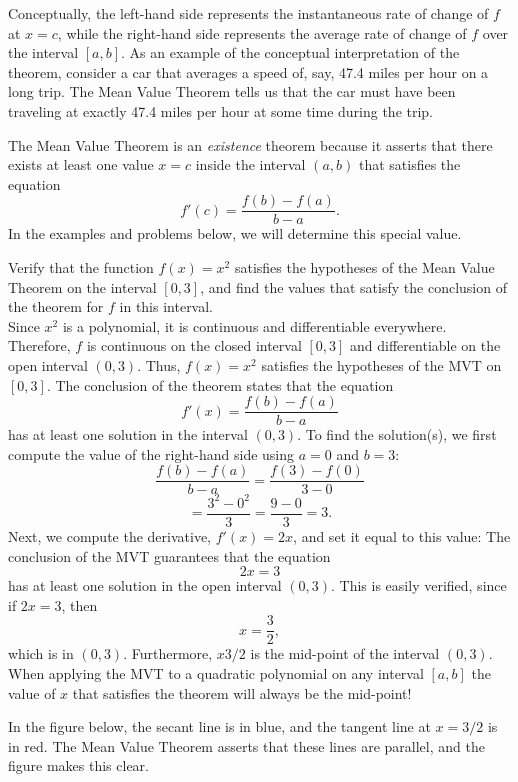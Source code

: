 \documentclass[handout]{ximera}
\begin{document}
Conceptually, the left-hand side represents the instantaneous rate of change of $f$ at $x = c$, while the
right-hand side represents the average rate of change of $f$ over the interval $[a,b]$. 
As an example of the conceptual interpretation of the theorem, consider a car that averages a speed of, say, 47.4 miles per hour on a long trip. 
The Mean Value Theorem tells us that the car must have been 
traveling at exactly 47.4 miles per hour at some time during the trip.

The Mean Value Theorem is an {\it existence} theorem because it asserts that there exists at least one value $x=c$ inside the interval $(a,b)$
that satisfies the equation 
\[f'(c) = \frac{f(b) - f(a)}{b-a}.\]
In the examples and problems below, we will determine this special value. 

\begin{example}[example 3]
Verify that the function $f(x) = x^2$ satisfies the hypotheses of the Mean Value Theorem
on the interval $[0,3]$, and find the values that satisfy the conclusion of the theorem for $f$ in this interval.\\
Since $x^2$ is a polynomial, it is continuous and differentiable everywhere. Therefore, $f$ is continuous on the closed interval $[0, 3]$ and differentiable on the open interval $(0, 3)$. 
Thus, $f(x) = x^2$ satisfies the hypotheses of the MVT on $[0, 3]$. The conclusion of the theorem states that the equation
\[
f'(x) = \frac{f(b) - f(a)}{b-a}
\]
has at least one solution in the interval $(0, 3)$. To find the solution(s), 
we first compute the value of the right-hand side using $a = 0$ and $b = 3$:
\[\frac{f(b) - f(a)}{b-a} = \frac{f(3) - f(0)}{3-0} \]
\[= \frac{3^2 - 0^2}{3}= \frac{9 - 0}{3} = 3.\]
Next, we compute the derivative, $f'(x) = 2x$, and set it equal to this value:
The conclusion of the MVT guarantees that the equation
\[2x = 3\]
has at least one solution in the open interval $(0,3)$.
This is easily verified, since if $2x = 3$, then 
\[x = \frac{3}{2},
\]
which is in $(0, 3)$.
Furthermore, $x 3/2$ is the mid-point of the interval $(0, 3)$.
When applying the MVT to a quadratic polynomial on any interval $[a, b]$ the value of $x$ that satisfies the theorem will always be the mid-point!

In the figure below, the secant line is in blue, 
and the tangent line at $x = 3/2$ is in red. The Mean Value Theorem asserts that these lines are parallel, and the figure makes this clear.


\end{example}
\end{document}
